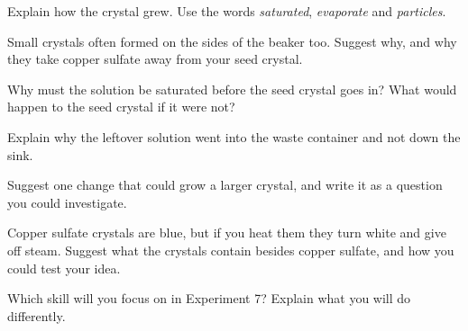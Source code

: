 \noindent
\begin{minipage}[t]{0.48\linewidth}\drawbox{6cm}{}\end{minipage}\hfill
\begin{minipage}[t]{0.48\linewidth}\drawbox{6cm}{}\end{minipage}


\task Explain how the crystal grew. Use the words \emph{saturated}, \emph{evaporate} and \emph{particles}.
\answerbox{5cm}

\task Small crystals often formed on the sides of the beaker too. Suggest why, and why they take copper sulfate away from your seed crystal.
\answerbox{4cm}

\task Why must the solution be saturated before the seed crystal goes in? What would happen to the seed crystal if it were not?
\answerbox{4cm}

\task Explain why the leftover solution went into the waste container and not down the sink. 
\answerbox{4cm}

\task Suggest one change that could grow a larger crystal, and write it as a question you could investigate. 
\answerbox{4cm}

\begin{yr8box}
\begin{keepext}
\exttask Copper sulfate crystals are blue, but if you heat them they turn white and give off steam. Suggest what the crystals contain besides copper sulfate, and how you could test your idea.
\answerbox{5cm}
\end{keepext}
\end{yr8box}


\begin{skillcheck}
\end{skillcheck}

\task Which skill will you focus on in Experiment 7? Explain what you will do differently.
\answerbox{5cm}

